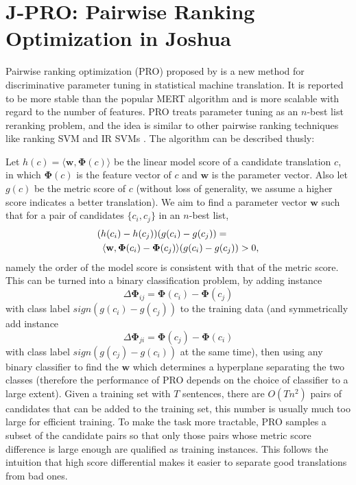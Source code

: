 \documentclass[11pt]{article}
\begin{document}
\section{J-PRO: Pairwise Ranking Optimization in Joshua}
\label{sec-pro}

Pairwise ranking optimization (PRO) proposed by \cite{PRO2011} is
a new method for discriminative parameter tuning in statistical
machine translation. It is reported to be more stable than the popular
MERT algorithm \cite{Och2003} and is more scalable with regard to the
number of features. PRO treats parameter tuning as an $n$-best list
reranking problem, and the idea is similar to other pairwise ranking
techniques like ranking SVM and IR SVMs \cite{Hang2011}. The algorithm
can be described thusly:

Let $h(c)=\langle \mathbf{w},\mathbf{\Phi}(c)\rangle$ be the linear
model score of a candidate translation $c$, in which
$\mathbf{\Phi}(c)$ is the feature vector of $c$ and $\mathbf{w}$ is
the parameter vector. Also let $g(c)$ be the metric score of $c$
(without loss of generality, we assume a higher score indicates a
better translation). We aim to find a parameter vector $\mathbf{w}$
such that for a pair of candidates $\{ c_i,c_j \}$ in an $n$-best
list,
\begin{align*}
  (h(c_i)-h(c_j))(g(c_i)-g(c_j)) & = \\
  & \hspace{-120pt} \langle \mathbf{w},\mathbf{\Phi}(c_i) -
  \mathbf{\Phi}(c_j)\rangle (g(c_i)-g(c_j)) >0 ,
\end{align*}
namely the order of the model score is consistent with that of the
metric score. This can be turned into a binary classification problem,
by adding instance
$$\Delta\mathbf{\Phi}_{ij}=\mathbf{\Phi}(c_i) - \mathbf{\Phi}(c_j)$$
with class label $\mathit{sign}(g(c_i)-g(c_j))$ to the training data (and
symmetrically add instance
$$\Delta\mathbf{\Phi}_{ji}=\mathbf{\Phi}(c_j) - \mathbf{\Phi}(c_i)$$
with class label $\mathit{sign}(g(c_j)-g(c_i))$ at the same time),
then using any binary classifier to find the $\mathbf{w}$ which
determines a hyperplane separating the two classes (therefore the
performance of PRO depends on the choice of classifier to a large
extent). Given a training set with $T$ sentences, there are $O(Tn^2)$
pairs of candidates that can be added to the training set, this number
is usually much too large for efficient training. To make the task
more tractable, PRO samples a subset of the candidate pairs so that
only those pairs whose metric score difference is large enough are
qualified as training instances. This follows the intuition that high
score differential makes it easier to separate good translations from
bad ones.
\end{document}
